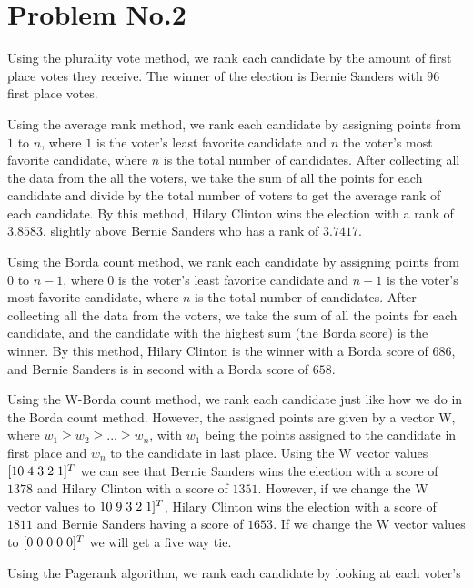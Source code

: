 \section*{Problem No.2} \label{sec:prob2}
Using the plurality vote method, we rank each candidate by the amount of first place votes they receive. The winner of the election is Bernie Sanders with $96$ first place votes.\vspace{1pc}

\noindent Using the average rank method, we rank each candidate by assigning points from $1$ to $n$, where $1$ is the voter's least favorite candidate and $n$ the voter's most favorite candidate, where $n$ is the total number of candidates. After collecting all the data from the all the voters, we take the sum of all the points for each candidate and divide by the total number of voters to get the average rank of each candidate. By this method, Hilary Clinton wins the election with a rank of $3.8583$, slightly above Bernie Sanders who has a rank of $3.7417$.\vspace{1pc}

\noindent Using the Borda count method, we rank each candidate by assigning points from $0$ to $n-1$, where $0$ is the voter's least favorite candidate and $n-1$ is the voter's most favorite candidate, where $n$ is the total number of candidates. After collecting all the data from the voters, we take the sum of all the points for each candidate, and the candidate with the highest sum (the Borda score) is the winner. By this method, Hilary Clinton is the winner with a Borda score of $686$, and Bernie Sanders is in second with a Borda score of $658$.\vspace{1pc}

\noindent Using the W-Borda count method, we rank each candidate just like how we do in the Borda count method. However, the assigned points are given by a vector W, where $w_1 \geq w_2 \geq ... \geq w_n$, with $w_1$ being the points assigned to the candidate in first place and $w_n$ to the candidate in last place. Using the W vector values $[10\hspace{1mm} 4\hspace{1mm} 3\hspace{1mm} 2\hspace{1mm} 1]^T$ we can see that Bernie Sanders wins the election with a score of $1378$ and Hilary Clinton with a score of $1351$. However, if we change the W vector values to $10\hspace{1mm} 9\hspace{1mm} 3\hspace{1mm} 2\hspace{1mm} 1]^T$, Hilary Clinton wins the election with a score of $1811$ and Bernie Sanders having a score of $1653$. If we change the W vector values to $[0\hspace{1mm} 0\hspace{1mm} 0\hspace{1mm} 0\hspace{1mm} 0]^T$ we will get a five way tie.\vspace{1pc}

\noindent Using the Pagerank algorithm, we rank each candidate by looking at each voter's 